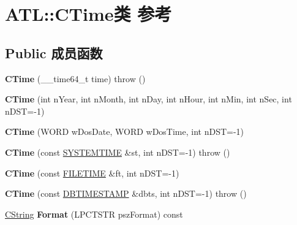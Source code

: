 \hypertarget{class_a_t_l_1_1_c_time}{}\section{A\+TL\+:\+:C\+Time类 参考}
\label{class_a_t_l_1_1_c_time}
\subsection*{Public 成员函数}
\begin{DoxyCompactItemize}
\item 
\mbox{\label{class_a_t_l_1_1_c_time_a85dd1eaba30e47964b858d4867a5cbb0}} 
{\bfseries C\+Time} (\+\_\+\+\_\+time64\+\_\+t time)  throw ()
\item 
\mbox{\label{class_a_t_l_1_1_c_time_a6b2e880ba5a9dd8378b4612514898dd9}} 
{\bfseries C\+Time} (int n\+Year, int n\+Month, int n\+Day, int n\+Hour, int n\+Min, int n\+Sec, int n\+D\+ST=-\/1)
\item 
\mbox{\label{class_a_t_l_1_1_c_time_ab6f0311b2a25502329041fffaf6ae165}} 
{\bfseries C\+Time} (W\+O\+RD w\+Dos\+Date, W\+O\+RD w\+Dos\+Time, int n\+D\+ST=-\/1)
\item 
\mbox{\label{class_a_t_l_1_1_c_time_a4a2a5a658c41190738fd26e87c9a5171}} 
{\bfseries C\+Time} (const \hyperlink{struct___s_y_s_t_e_m_t_i_m_e}{S\+Y\+S\+T\+E\+M\+T\+I\+ME} \&st, int n\+D\+ST=-\/1)  throw ()
\item 
\mbox{\label{class_a_t_l_1_1_c_time_aac66bc63193bb14e958a98a334e29b6c}} 
{\bfseries C\+Time} (const \hyperlink{struct___f_i_l_e_t_i_m_e}{F\+I\+L\+E\+T\+I\+ME} \&ft, int n\+D\+ST=-\/1)
\item 
\mbox{\label{class_a_t_l_1_1_c_time_ad16491cb8f84bb3a817e7715a8bcdd08}} 
{\bfseries C\+Time} (const \hyperlink{struct_d_b_t_i_m_e_s_t_a_m_p}{D\+B\+T\+I\+M\+E\+S\+T\+A\+MP} \&dbts, int n\+D\+ST=-\/1)  throw ()
\item 
\mbox{\label{class_a_t_l_1_1_c_time_af092f98244b04971f7651e27b2006bd1}} 
\hyperlink{class_a_t_l_1_1_c_string_t}{C\+String} {\bfseries Format} (L\+P\+C\+T\+S\+TR psz\+Format) const

\end{DoxyCompactItemize}

